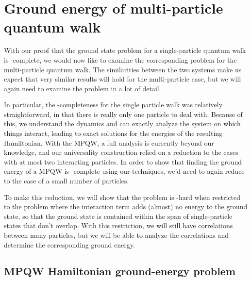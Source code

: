 \documentclass[../thesis-main/thesis-main]{subfiles}
\begin{document}
\chapter{Ground energy of multi-particle quantum walk}
\label{chap:MP_ground}



With our proof that the ground state problem for a single-particle quantum walk is \QMA-complete, we would now like to examine the corresponding problem for the multi-particle quantum walk.  The similarities between the two systems make us expect that very similar results will hold for the multi-particle case, but we will again need to examine the problem in a lot of detail.

In particular, the \QMA-completeness for the single particle walk was relatively straightforward, in that there is really only one particle to deal with.  Because of this, we understand the dynamics and can exactly analyze the system on which things interact, leading to exact solutions for the energies of the resulting Hamiltonian.  With the MPQW, a full analysis is currently beyond our knowledge, and our universality construction relied on a reduction to the cases with at most two interacting particles.  In order to show that finding the ground energy of a MPQW is \QMA-complete using our techniques, we'd need to again reduce to the case of a small number of particles.

To make this reduction, we will show that the problem is \QMA-hard when restricted to the problem where the interaction term adds (almost) no energy to the ground state, so that the ground state is contained within the span of single-particle states that don't overlap.  With this restriction, we will still have correlations between many particles, but we will be able to analyze the correlations and determine the corresponding ground energy.

\section{MPQW Hamiltonian ground-energy problem}
\end{document}
